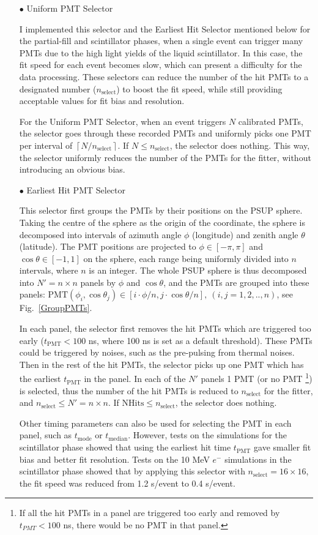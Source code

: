 \begin{itemize}
	\item[$\bullet$] Uniform PMT Selector
	
	I implemented this selector and the Earliest Hit Selector mentioned below for the partial-fill and scintillator phases, when a single event can trigger many PMTs due to the high light yields of the liquid scintillator. In this case, the fit speed for each event becomes slow, which can present a difficulty for the data processing. These selectors can reduce the number of the hit PMTs to a designated number ($n_\mathrm{select}$) to boost the fit speed, while still providing acceptable values for fit bias and resolution. 
	
	For the Uniform PMT Selector, when an event triggers $N$ calibrated PMTs, the selector goes through these recorded PMTs and uniformly picks one PMT per interval of $\left \lceil{N/n_\mathrm{select}}\right \rceil $. If $N\leq n_\mathrm{select}$, the selector does nothing. This way, the selector uniformly reduces the number of the PMTs for the fitter, without introducing an obvious bias.
	
	\item[$\bullet$] Earliest Hit PMT Selector
	
	This selector first groups the PMTs by their positions on the PSUP sphere. Taking the centre of the sphere as the origin of the coordinate, the sphere is decomposed into intervals of azimuth angle $\phi$ (longitude) and zenith angle $\theta$ (latitude). The PMT positions are projected to $\phi\in [-\pi,\pi]$ and $\cos\theta\in [-1, 1]$ on the sphere, each range being uniformly divided into $n$ intervals, where $n$ is an integer. The whole PSUP sphere is thus decomposed into $N'=n\times n$ panels by $\phi$ and $\cos\theta$, and the PMTs are grouped into these panels: $\mathrm{PMT}(\phi_i,\cos\theta_j) \in [i\cdot\phi/n, j\cdot\cos\theta/n],~(i,j=1,2,..,n)$, see Fig.~\ref{GroupPMTs}.
	
	In each panel, the selector first removes the hit PMTs which are triggered too early ($t_\mathrm{PMT}<100$ ns, where 100 ns is set as a default threshold). These PMTs could be triggered by noises, such as the pre-pulsing from thermal noises. Then in the rest of the hit PMTs, the selector picks up one PMT which has the earliest $t_\mathrm{PMT}$ in the panel. In each of the $N'$ panels 1 PMT (or no PMT \footnote{If all the hit PMTs in a panel are triggered too early and removed by $t_{PMT}<100$ ns, there would be no PMT in that panel.}) is selected, thus the number of the hit PMTs is reduced to $n_\mathrm{select}$ for the fitter, and $n_\mathrm{select}\leq N'=n\times n$. If $\mathrm{NHits}\leq n_\mathrm{select}$, the selector does nothing. 
	
	Other timing parameters can also be used for selecting the PMT in each panel, such as $t_\mathrm{mode}$ or $t_\mathrm{median}$. However, tests on the simulations for the scintillator phase showed that using the earliest hit time $t_\mathrm{PMT}$ gave smaller fit bias and better fit resolution. Tests on the 10 MeV $e^-$ simulations in the scintillator phase showed that by applying this selector with $n_\mathrm{select}=16\times16$, the fit speed was reduced from 1.2 s/event to 0.4 s/event.
\end{itemize}

